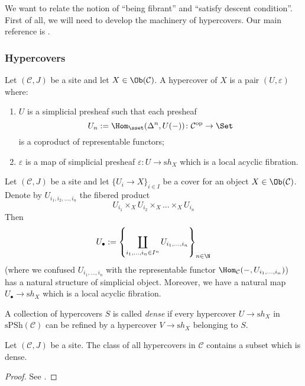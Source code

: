 We want to relate the notion of ``being fibrant'' and ``satisfy descent condition''. First of all, we will need to develop the machinery of hypercovers. Our main reference is .

\subsubsection{Hypercovers}

\begin{defin}
Let $(\mathcal C, J)$ be a site and let $X \in \Ob(\mathcal C)$. A hypercover of $X$ is a pair $(U,\varepsilon)$ where:
\begin{enumerate}
\item $U$ is a simplicial presheaf such that each presheaf
\[
U_n := \Hom_{\sset}(\Delta^n, U(-)) \colon \mathcal C^{\mathrm{op}} \to \Set
\]
is a coproduct of representable functors;
\item $\varepsilon$ is a map of simplicial presheaf $\varepsilon \colon U \to \mathrm sh_X$ which is a local acyclic fibration.
\end{enumerate}
\end{defin}

\begin{eg}
Let $(\mathcal C,J)$ be a site and let $\{U_i \to X\}_{i \in I}$ be a cover for an object $X \in \Ob(\mathcal C)$. Denote by $U_{i_1, i_2, \ldots, i_n}$ the fibered product
\[
U_{i_1} \times_X U_{i_2} \times_X \ldots \times_X U_{i_n}
\]
Then
\[
U_\bullet := \left\{ \coprod_{i_1,\ldots,i_n \in I^n} U_{i_1,\ldots,i_n} \right\}_{n \in \N}
\]
(where we confused $U_{i_1,\ldots,i_n}$ with the representable functor $\Hom_{\mathcal C}(-,U_{i_1,\ldots,i_n})$) has a natural structure of simplicial object. Moreover, we have a natural map $U_\bullet \to \mathrm sh_X$ which is a local acyclic fibration.
\end{eg}

\begin{defin}
A collection of hypercovers $S$ is called \emph{dense} if every hypercover $U \to \mathrm sh_X$ in $\mathrm{sPSh}(\mathcal C)$ can be refined by a hypercover $V \to \mathrm sh_X$ belonging to $S$.
\end{defin}

\begin{lemma}
Let $(\mathcal C,J)$ be a site. The class of all hypercovers in $\mathcal C$ contains a subset which is dense.
\end{lemma}

\begin{proof}
See .
\end{proof}

